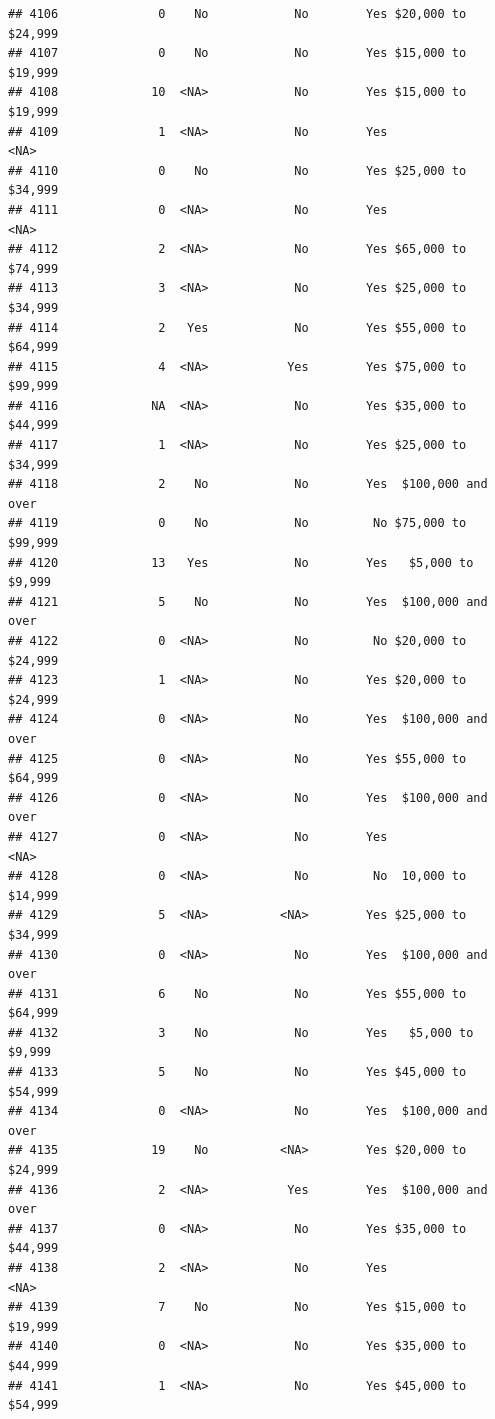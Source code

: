 \documentclass[man]{apa6}
\begin{document}
\begin{verbatim}
## 4106              0    No            No        Yes $20,000 to $24,999
## 4107              0    No            No        Yes $15,000 to $19,999
## 4108             10  <NA>            No        Yes $15,000 to $19,999
## 4109              1  <NA>            No        Yes               <NA>
## 4110              0    No            No        Yes $25,000 to $34,999
## 4111              0  <NA>            No        Yes               <NA>
## 4112              2  <NA>            No        Yes $65,000 to $74,999
## 4113              3  <NA>            No        Yes $25,000 to $34,999
## 4114              2   Yes            No        Yes $55,000 to $64,999
## 4115              4  <NA>           Yes        Yes $75,000 to $99,999
## 4116             NA  <NA>            No        Yes $35,000 to $44,999
## 4117              1  <NA>            No        Yes $25,000 to $34,999
## 4118              2    No            No        Yes  $100,000 and over
## 4119              0    No            No         No $75,000 to $99,999
## 4120             13   Yes            No        Yes   $5,000 to $9,999
## 4121              5    No            No        Yes  $100,000 and over
## 4122              0  <NA>            No         No $20,000 to $24,999
## 4123              1  <NA>            No        Yes $20,000 to $24,999
## 4124              0  <NA>            No        Yes  $100,000 and over
## 4125              0  <NA>            No        Yes $55,000 to $64,999
## 4126              0  <NA>            No        Yes  $100,000 and over
## 4127              0  <NA>            No        Yes               <NA>
## 4128              0  <NA>            No         No  10,000 to $14,999
## 4129              5  <NA>          <NA>        Yes $25,000 to $34,999
## 4130              0  <NA>            No        Yes  $100,000 and over
## 4131              6    No            No        Yes $55,000 to $64,999
## 4132              3    No            No        Yes   $5,000 to $9,999
## 4133              5    No            No        Yes $45,000 to $54,999
## 4134              0  <NA>            No        Yes  $100,000 and over
## 4135             19    No          <NA>        Yes $20,000 to $24,999
## 4136              2  <NA>           Yes        Yes  $100,000 and over
## 4137              0  <NA>            No        Yes $35,000 to $44,999
## 4138              2  <NA>            No        Yes               <NA>
## 4139              7    No            No        Yes $15,000 to $19,999
## 4140              0  <NA>            No        Yes $35,000 to $44,999
## 4141              1  <NA>            No        Yes $45,000 to $54,999

\end{verbatim}
\end{document}
